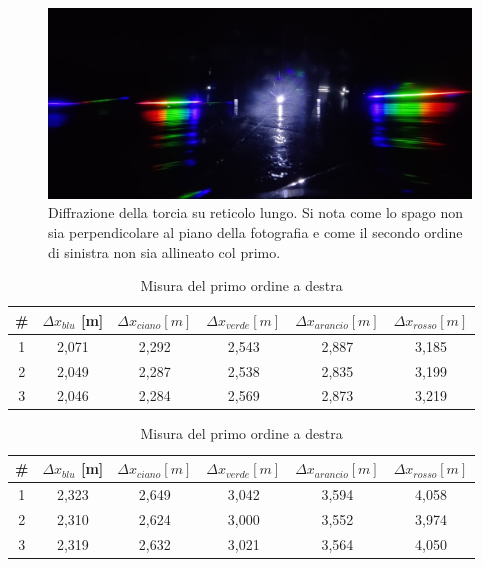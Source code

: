 \documentclass{article}
\begin{document}
\begin{figure}[h]
    \centering
    \includegraphics[width=0.7\linewidth]{TorciaLungo1_OFF.jpg}
    \caption{Diffrazione della torcia su reticolo lungo. Si nota come lo spago non sia perpendicolare al piano della fotografia e come il secondo ordine di sinistra non sia allineato col primo.}
    \label{TorciaLungo}
\end{figure}

\begin{table}[h]
    \centering
    \begin{tabular}{||c|c|c|c|c|c||}
        \hline
        \# & \cellcolor{blue}$\Delta x_{blu}$ [m] & \cellcolor{cyan}$\Delta x_{ciano}[m]$ & \cellcolor{green}$\Delta x_{verde}[m]$ & \cellcolor{orange}$\Delta x_{arancio}[m]$ & \cellcolor{red}$\Delta x_{rosso}[m]$ \\
        \hline
        1 & 2,071 & 2,292 & 2,543 & 2,887 & 3,185 \\
        2 & 2,049 & 2,287 & 2,538 & 2,835 & 3,199 \\
        3 & 2,046 & 2,284 & 2,569 & 2,873 & 3,219 \\
        \hline
    \end{tabular}
    \caption{Misura del primo ordine a sinistra}
\centering
\begin{tabular}{||c|c|c|c|c|c||}
    \hline
    \# & \cellcolor{blue}$\Delta x_{blu}$ [m] & \cellcolor{cyan}$\Delta x_{ciano}[m]$ & \cellcolor{green}$\Delta x_{verde}[m]$ & \cellcolor{orange}$\Delta x_{arancio}[m]$ & \cellcolor{red}$\Delta x_{rosso}[m]$ \\
    \hline
    1 & 2,323 & 2,649 & 3,042 & 3,594 & 4,058 \\
    2 & 2,310 & 2,624 & 3,000 & 3,552 & 3,974 \\
    3 & 2,319 & 2,632 & 3,021 & 3,564 & 4,050 \\
    \hline
\end{tabular}
\caption{Misura del primo ordine a destra}
\end{table}
\end{document}
